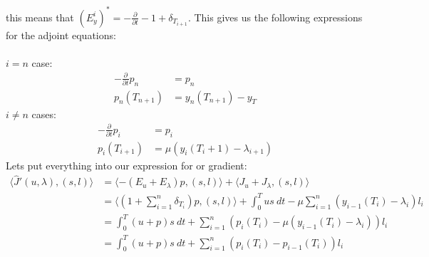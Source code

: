 \documentclass[11pt,a4paper]{report}
\begin{document}
this means that $(E_y^i)^*=-\frac{\partial }{\partial t}-1 + \delta_{T_{i+1}}$. This gives us the following expressions for the adjoint equations:
\\
\\
$i=n$ case:
\begin{align*}
-\frac{\partial }{\partial t}p_n &=p_n  \\
p_n(T_{n+1}) &= y_n(T_{n+1})-y_T
\end{align*}
$i\neq n$ cases:
\begin{align*}
-\frac{\partial }{\partial t}p_i &=p_i  \\
p_i(T_{i+1}) &= \mu(y_{i}(T_i+1)-\lambda_{i+1} )
\end{align*}
Lets put everything into our expression for or gradient:
\begin{align*}
\langle \hat{J}'(u,\lambda), (s,l)\rangle&=\langle -(E_u+E_{\lambda})p, (s,l)\rangle + \langle J_u+J_{\lambda}, (s,l)\rangle \\
&= \langle (1+\sum_{i=1}^n \delta_{T_i})p , (s,l)\rangle+ \int_0^T us \ dt - \mu \sum_{i=1}^{n}(y_{i-1}(T_i)-\lambda_i)l_i\\
&=\int_0^T (u+p)s \ dt +\sum_{i=1}^n(p_{i}(T_i) -\mu(y_{i-1}(T_i)-\lambda_i) )l_i \\
&= \int_0^T (u+p)s \ dt +\sum_{i=1}^n(p_{i}(T_i) -p_{i-1}(T_i) )l_i
\end{align*} 
\end{document}

